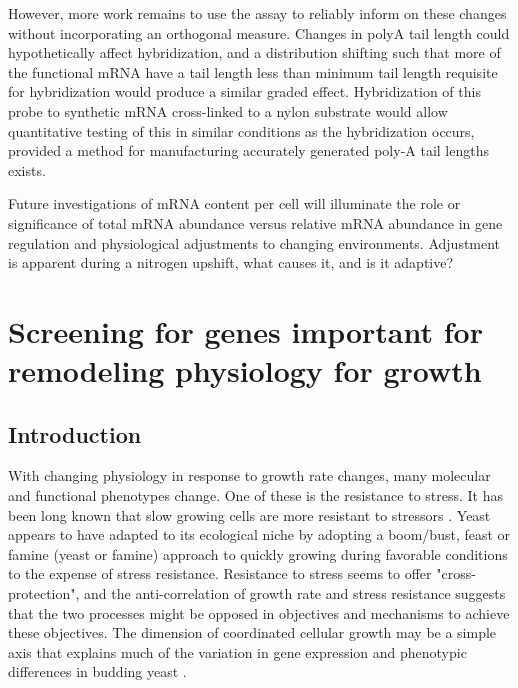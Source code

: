 However, more work remains to use the assay to reliably inform on
these changes without incorporating an orthogonal measure.
Changes in polyA tail length could hypothetically affect
hybridization, and a distribution shifting such that more of the
functional mRNA have a tail length less than minimum tail length
requisite for hybridization would produce a similar graded effect.
Hybridization of this probe to synthetic mRNA cross-linked to a nylon
substrate would allow quantitative testing of this in similar
conditions as the hybridization occurs, provided a method for
manufacturing accurately generated poly-A tail lengths exists.

Future investigations of mRNA content per cell will illuminate
the role or significance of total mRNA abundance 
versus relative mRNA abundance in gene regulation and physiological
adjustments to changing environments. Adjustment is apparent during a 
nitrogen upshift, what causes it, and is it adaptive?

\section{Screening for genes important for remodeling physiology for
growth}

\subsection{Introduction}



With changing physiology in response to growth rate changes, many
molecular and functional phenotypes change. One of these is the
resistance to stress. 
It has been long known that slow growing cells are more resistant to
stressors
\parencite{sherman1923physiological,elliott1993stress,lu2009slow}.
Yeast appears to have adapted to its ecological niche by adopting a
boom/bust, feast or famine (yeast or famine) approach to quickly
growing during favorable conditions to the expense of stress
resistance. 
Resistance to stress seems to offer "cross-protection", and the
anti-correlation of growth rate and stress resistance suggests that
the two processes might be opposed in objectives and mechanisms to
achieve these objectives.
The dimension of coordinated cellular growth may be a simple axis that
explains much of the variation in gene expression and phenotypic
differences in budding yeast
\parencite{brauer2008coordination,lu2009slow}.

